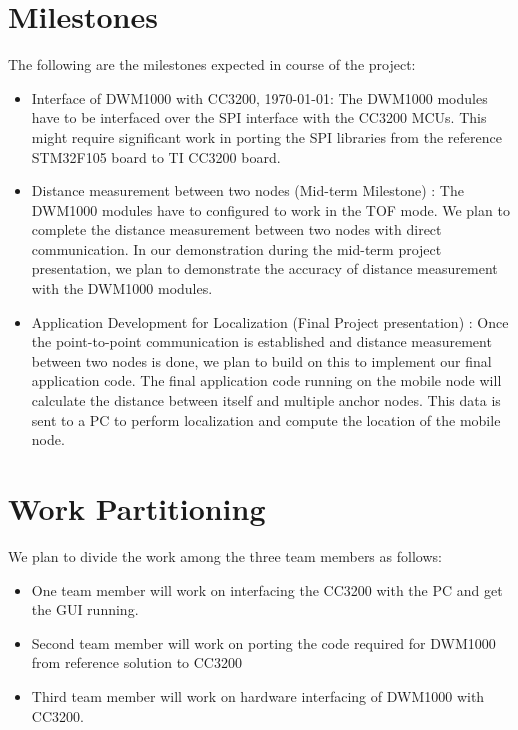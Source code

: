 \documentclass[journal,transmag]{IEEEtran}
\begin{document}
\section{Milestones}
The following are the milestones expected in course of the project:
\begin{itemize}
    \item Interface of DWM1000 with CC3200, \today : The DWM1000 modules have to be interfaced over the SPI interface with the CC3200 MCUs. This might require significant work in porting the SPI libraries from the reference STM32F105 board to TI CC3200 board.
    \item Distance measurement between two nodes (Mid-term Milestone) : The DWM1000 modules have to configured to work in the TOF mode. We plan to complete the distance measurement between two nodes with direct communication. In our demonstration during the mid-term project presentation, we plan to demonstrate the accuracy of distance measurement with the DWM1000 modules.
    \item Application Development for Localization (Final Project presentation) : Once the point-to-point communication is established and distance measurement between two nodes is done, we plan to build on this to implement our final application code. The final application code running on the mobile node will calculate the distance between itself and multiple anchor nodes. This data is sent to a PC to perform localization and compute the location of the mobile node. 

\end{itemize}
\section{Work Partitioning}
We plan to divide the work among the three team members as follows:
\begin{itemize}
    \item One team member will work on interfacing the CC3200 with the PC and get the GUI running. 
    \item Second team member will work on porting the code required for DWM1000 from reference solution to CC3200
    \item Third team member will work on hardware interfacing of DWM1000 with CC3200.
\end{itemize}
\end{document}
